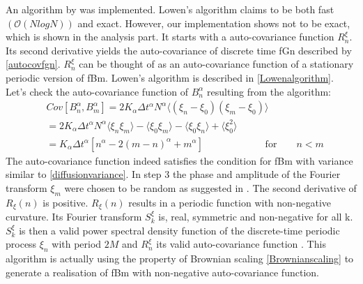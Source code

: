 \documentclass[
  a4paper,BCOR10mm,oneside,
  headsepline,footsepline,%
  fleqn,openbib
]{scrbook}
\begin{document}
 An algorithm by \citet{Lowen1999} was implemented. Lowen's algorithm claims to be both fast $(\mathcal{O}(NlogN))$ and exact. However, our implementation shows not to be exact, which is shown in the analysis part. It starts with a auto-covariance function $R^{\xi}_n$. Its second derivative yields the auto-covariance of discrete time fGn described by \cref{autocovfgn}. $R^{\xi}_n$ can be thought of as an auto-covariance function of a stationary periodic version of fBm. Lowen's algorithm is described in \cref{Lowenalgorithm}. Let's check the auto-covariance function of $B^{\alpha}_n$ resulting from the algorithm: 
\begin{align}
  & Cov[B^{\alpha}_n,B^{\alpha}_m]= 2 K_{\alpha} \Delta t^{\alpha} N^{\alpha} \langle (\xi_n- \xi_0) (\xi_m- \xi_0)\rangle \\
 &=  2 K_{\alpha} \Delta t^{\alpha} N^{\alpha}\langle\xi_n \xi_m\rangle -\langle \xi_0 \xi_m \rangle - \langle \xi_0 \xi_n\rangle +\langle \xi_0^2\rangle \\ 
 &= K_{\alpha} \Delta t^{\alpha}[n^{\alpha}-2(m-n)^{\alpha}+m^{\alpha}]\qquad \qquad \qquad \text{ for} \qquad n < m
\end{align}
The auto-covariance function indeed satisfies the condition for fBm with variance similar to \cref{diffusionvariance}. In step 3 the phase and amplitude of the Fourier transform  $\xi_m$ were chosen to be random  as suggested in \cite{Timmer1995}. The second derivative of $R_{\xi}(n) $ is positive. $R_{\xi}(n) $ results in a periodic function with non-negative curvature. Its Fourier transform $S^{\xi}_k$ is, real, symmetric  and non-negative for all k. $S^{\xi}_k$ is then a valid power spectral density function of the discrete-time periodic process $\xi_n$ with period $2M$ and  $R^{\xi}_n$ its valid auto-covariance function \cite{Lowen1999}. This algorithm is actually using the property of Brownian scaling \cref{Brownianscaling} to generate a realisation of fBm  with non-negative auto-covariance function. 
\end{document}
